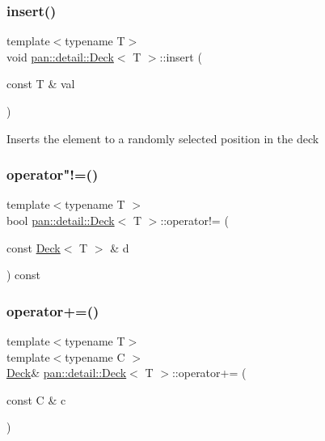 \subsubsection{\texorpdfstring{insert()}{insert()}}
{\footnotesize\ttfamily template$<$typename T$>$ \\
void \hyperlink{classpan_1_1detail_1_1_deck}{pan\+::detail\+::\+Deck}$<$ T $>$\+::insert (\begin{DoxyParamCaption}\item[{const T \&}]{val }\end{DoxyParamCaption})}

Inserts the element to a randomly selected position in the deck \mbox{\label{classpan_1_1detail_1_1_deck_ad63bb7177e7e051fec7beae3a3989cf7}} 
\subsubsection{\texorpdfstring{operator"!=()}{operator!=()}}
{\footnotesize\ttfamily template$<$typename T $>$ \\
bool \hyperlink{classpan_1_1detail_1_1_deck}{pan\+::detail\+::\+Deck}$<$ T $>$\+::operator!= (\begin{DoxyParamCaption}\item[{const \hyperlink{classpan_1_1detail_1_1_deck}{Deck}$<$ T $>$ \&}]{d }\end{DoxyParamCaption}) const\hspace{0.3cm}{\ttfamily [inline]}}

\mbox{\label{classpan_1_1detail_1_1_deck_a51483b834bcae54ce386de8dbd646f11}} 
\subsubsection{\texorpdfstring{operator+=()}{operator+=()}\hspace{0.1cm}{\footnotesize\ttfamily [1/2]}}
{\footnotesize\ttfamily template$<$typename T$>$ \\
template$<$typename C $>$ \\
\hyperlink{classpan_1_1detail_1_1_deck}{Deck}\& \hyperlink{classpan_1_1detail_1_1_deck}{pan\+::detail\+::\+Deck}$<$ T $>$\+::operator+= (\begin{DoxyParamCaption}\item[{const C \&}]{c }\end{DoxyParamCaption})}

